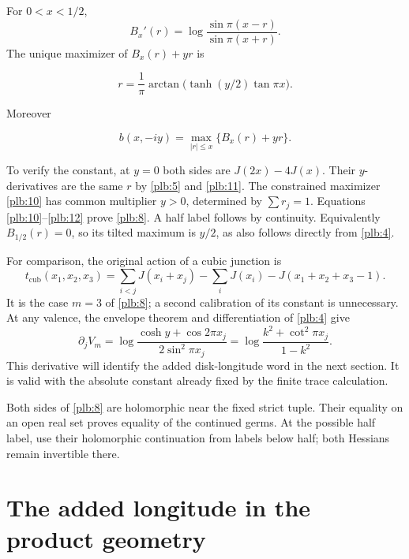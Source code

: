 For \(0<x<1/2\),
\[
 B_x'(r)=\log\frac{\sin\pi(x-r)}{\sin\pi(x+r)}.
\]
The unique maximizer of \(B_x(r)+yr\) is

\begin{equation}\label{plb:11}
r=\frac1\pi\arctan\bigl(\tanh(y/2)\tan\pi x\bigr).
\end{equation}

Moreover

\begin{equation}\label{plb:12}
b(x,-iy)=\max_{|r|\le x}\{B_x(r)+yr\}.
\end{equation}

To verify the constant, at \(y=0\) both sides are
\(J(2x)-4J(x)\). Their \(y\)-derivatives are the same \(r\) by \eqref{plb:5} and \eqref{plb:11}. The constrained maximizer \eqref{plb:10} has common multiplier \(y>0\), determined by \(\sum r_j=1\). Equations \eqref{plb:10}--\eqref{plb:12} prove \eqref{plb:8}. A half label follows by continuity. Equivalently \(B_{1/2}(r)=0\), so its tilted maximum is \(y/2\), as also follows directly from \eqref{plb:4}.

For comparison, the original action of a cubic junction is
\begin{equation}\label{plb:13}
t_{\mathrm{cub}}(x_1,x_2,x_3)=
 \sum_{i<j}J(x_i+x_j)-\sum_iJ(x_i)-J(x_1+x_2+x_3-1).
\end{equation}
It is the case $m=3$ of \eqref{plb:8}; a second calibration of its
constant is unnecessary. At any valence, the envelope theorem and
differentiation of \eqref{plb:4} give
\begin{equation}\label{plb:14}
\partial_jV_m=
\log\frac{\cosh y+\cos2\pi x_j}{2\sin^2\pi x_j}
   =\log\frac{k^2+\cot^2\pi x_j}{1-k^2}.
\end{equation}
This derivative will identify the added disk-longitude word in the
next section. It is valid with the absolute constant already fixed
by the finite trace calculation.

Both sides of \eqref{plb:8} are holomorphic near the fixed strict tuple. Their equality on an open real set proves equality of the continued germs. At the possible half label, use their holomorphic continuation from labels below half; both Hessians remain invertible there.

\section{The added longitude in the product geometry}\label{plb:the-actual-added-longitude-in-the-old-prism-geometry}

